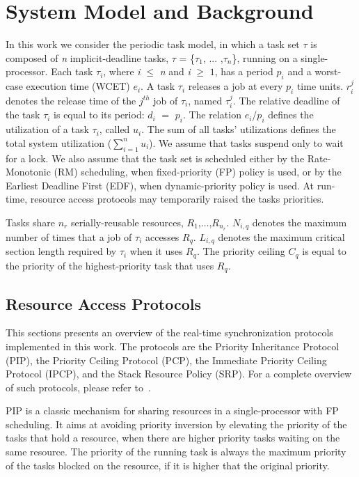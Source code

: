 \section{System Model and Background}
\label{sec:back}

In this  work we  consider the periodic task model, in which a  task set  
$\tau$ is composed  of \textit{n}  implicit-deadline  tasks, $\tau$ = 
\{$\tau_1$, ... ,$\tau_n$\}, running on a single-processor. Each task  
$\tau_{i}$, where \textit{i} $\leq$  \textit{n} and \textit{i} $\geq$ $1$, has a 
 period \textit{$p_{i}$} and  a worst-case execution time (WCET) 
\textit{$e_{i}$}. A task $\tau_{i}$  releases a job at every \textit{$p_{i}$} 
time units. $r_i^j$ denotes the release time of the $j^{th}$ job of $\tau_{i}$, 
named $\tau_i^j$. The relative deadline of the task $\tau_i$ is equal to its 
period: $d_i$ $=$ $p_i$. The relation \textit{$e_{i}$}/\textit{$p_{i}$} defines 
the utilization of a task $\tau_{i}$, called $u_i$. The sum of all tasks' 
utilizations defines the total system utilization ($\sum_{i=1}^n u_i$). We 
assume that tasks suspend only to wait for a lock. We also assume that the task 
set is scheduled either by the Rate-Monotonic (RM) scheduling, when
fixed-priority (FP) policy is used, or by the Earliest Deadline First (EDF), 
when dynamic-priority policy is used. At run-time, resource access protocols 
may temporarily raised the tasks priorities. 

Tasks share $n_r$ serially-reusable resources, $R_1$,$\ldots$,$R_{n_r}$. 
$N_{i,q}$ denotes the maximum number of times that a job of $\tau_i$ accesses 
$R_q$. $L_{i,q}$ denotes the maximum critical section length required by 
$\tau_i$ when it uses $R_q$. The priority ceiling $C_q$ is equal to the 
priority of the highest-priority task that uses $R_q$. 

\subsection{Resource Access Protocols}

This sections presents an overview of the real-time synchronization protocols 
implemented in this work. The protocols are the Priority Inheritance Protocol 
(PIP), the Priority Ceiling Protocol (PCP), the Immediate Priority Ceiling 
Protocol (IPCP), and the Stack Resource Policy (SRP). For a complete overview 
of such protocols, please refer to~\cite{Liu:2000,Buttazzo:2011}.

PIP is a classic mechanism for sharing resources in a single-processor with
FP scheduling. It aims at avoiding priority inversion by 
elevating the priority of the tasks that hold a resource, when there are higher 
priority tasks waiting on the same resource. The priority of the running task 
is always the maximum priority of the tasks blocked on the resource, if it is 
higher that the original priority.

